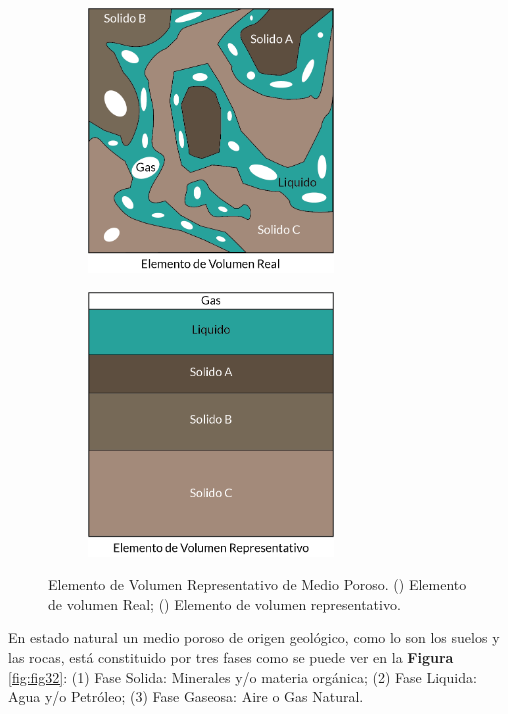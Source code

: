 \begin{figure}[!ht]
\centering
\begin{subfigure}[b]{.45\textwidth}
        \centering
        \includegraphics[width=6.5cm]{Imagenes/Kap_03/Real.png}
        \caption{}
        \label{fig:fig31a}
\end{subfigure}
\hfill
\begin{subfigure}[b]{.45\textwidth}
        \centering
        \includegraphics[width=6.5cm]{Imagenes/Kap_03/REV.png}
        \caption{}
        \label{fig:fig31b}
\end{subfigure}
\captionsetup{format=plain}
\caption[Elemento de Volumen Representativo de Medio Poroso]{Elemento de Volumen Representativo de Medio Poroso. () Elemento de volumen Real; () Elemento de volumen representativo.} 
\label{fig:fig31}
\end{figure}


En estado natural un medio poroso de origen geológico, como lo son los suelos y las rocas, está constituido por tres fases como se puede ver en la \textbf{Figura} \ref{fig:fig32}: (1) Fase Solida: Minerales y/o materia orgánica; (2) Fase Liquida: Agua y/o Petróleo; (3) Fase Gaseosa: Aire o Gas Natural.\bigskip

